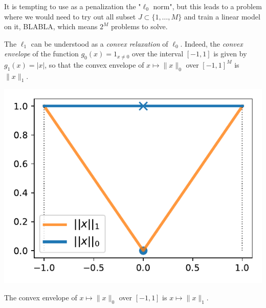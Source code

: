 \documentclass[
	fontsize=11pt, %
	twoside=false, %
	numbers=noenddot, %
]{kaobook}
\newcommand{\norm}[1]{\| #1 \|}
\begin{document}
It is tempting to use as a penalization the "$\ell_0$ norm", but this leads to a problem where we would need to try out all subset $J \subset \{ 1, \ldots, M \}$ and train a linear model on it, BLABLA, which means $2^M$ problems to solve.

The $\ell_1$ can be understood as a \emph{convex relaxation} of $\ell_0$.
Indeed, the \emph{convex envelope}%
of the function $g_0(x) = 1_{x \neq 0}$ over the interval $[-1, 1]$ is given by $g_1(x) = |x|$, so that the convex envelope of $x \mapsto \norm{x}_0$ over $[-1, 1]^M$ is $\norm{x}_1$.

\begin{marginfigure}
	\includegraphics{assets/l0_l1.pdf}
	\caption{The convex envelope of $x \mapsto \norm{x}_0$ over $[-1, 1]$ is $x \mapsto \norm{x}_1$.}
	\label{fig:l0-l1}
\end{marginfigure}


\end{document}
